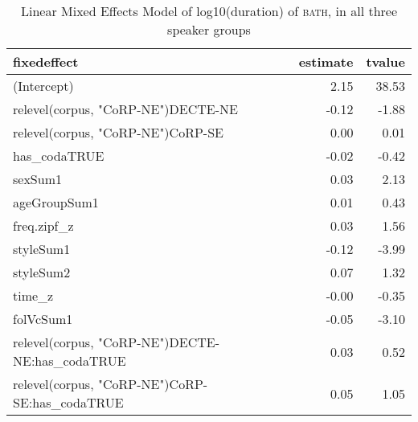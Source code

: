 \begin{table}[ht]
\centering
\begin{tabular}{lrr}
  \hline
fixedeffect & estimate & tvalue \\ 
  \hline
(Intercept) & 2.15 & 38.53 \\ 
  relevel(corpus, "CoRP-NE")DECTE-NE & -0.12 & -1.88 \\ 
  relevel(corpus, "CoRP-NE")CoRP-SE & 0.00 & 0.01 \\ 
  has\_codaTRUE & -0.02 & -0.42 \\ 
  sexSum1 & 0.03 & 2.13 \\ 
  ageGroupSum1 & 0.01 & 0.43 \\ 
  freq.zipf\_z & 0.03 & 1.56 \\ 
  styleSum1 & -0.12 & -3.99 \\ 
  styleSum2 & 0.07 & 1.32 \\ 
  time\_z & -0.00 & -0.35 \\ 
  folVcSum1 & -0.05 & -3.10 \\ 
  relevel(corpus, "CoRP-NE")DECTE-NE:has\_codaTRUE & 0.03 & 0.52 \\ 
  relevel(corpus, "CoRP-NE")CoRP-SE:has\_codaTRUE & 0.05 & 1.05 \\ 
   \hline
\end{tabular}
\caption{Linear Mixed Effects Model of log10(duration) of \textsc{bath}, in all three speaker groups \label{tbl:Bdur}} 
\end{table}
